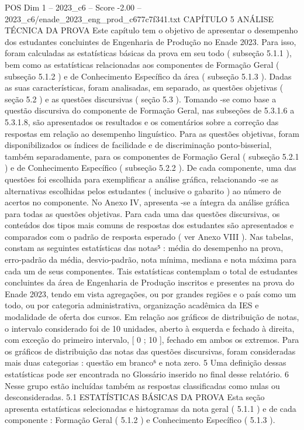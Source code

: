 \begin{textsample}{POS Dim 1 – 2023\_c6 – Score -2.00 – 2023\_c6/enade\_2023\_eng\_prod\_c677c7f341.txt}  \label{ex:f1_pos_237}
CAPÍTULO 5 ANÁLISE TÉCNICA DA PROVA Este capítulo tem o objetivo de apresentar o desempenho dos estudantes concluintes de Engenharia de Produção no Enade 2023.
Para isso, foram calculadas as estatísticas básicas da prova em seu todo ( subseção 5.1.1 ), bem como as estatísticas relacionadas aos componentes de Formação Geral ( subseção 5.1.2 ) e de Conhecimento Específico da área ( subseção 5.1.3 ).
Dadas as suas características, foram analisadas, em separado, as questões objetivas ( seção 5.2 ) e as questões discursivas ( seção 5.3 ).
Tomando -se como base a questão discursiva do componente de Formação Geral, nas subseções de 5.3.1.6 a 5.3.1.8, são apresentados os resultados e os comentários sobre a correção das respostas em relação ao desempenho linguístico.
Para as questões objetivas, foram disponibilizados os índices de facilidade e de discriminação ponto-bisserial, também separadamente, para os componentes de Formação Geral ( subseção 5.2.1 ) e de Conhecimento Específico ( subseção 5.2.2 ).
De cada componente, uma das questões foi escolhida para exemplificar a análise gráfica, relacionando -se as alternativas escolhidas pelos estudantes ( inclusive o gabarito ) ao número de acertos no componente.
No Anexo IV, apresenta -se a íntegra da análise gráfica para todas as questões objetivas.
Para cada uma das questões discursivas, os conteúdos dos tipos mais comuns de respostas dos estudantes são apresentados e comparados com o padrão de resposta esperado ( ver Anexo VIII ).
Nas tabelas, constam as seguintes estatísticas das notas⁵ : média do desempenho na prova, erro-padrão da média, desvio-padrão, nota mínima, mediana e nota máxima para cada um de seus componentes.
Tais estatísticas contemplam o total de estudantes concluintes da área de Engenharia de Produção inscritos e presentes na prova do Enade 2023, tendo em vista agregações, ou por grandes regiões e o país como um todo, ou por categoria administrativa, organização acadêmica da IES e modalidade de oferta dos cursos.
Em relação aos gráficos de distribuição de notas, o intervalo considerado foi de 10 unidades, aberto à esquerda e fechado à direita, com exceção do primeiro intervalo, [ 0 ; 10 ], fechado em ambos os extremos.
Para os gráficos de distribuição das notas das questões discursivas, foram consideradas mais duas categorias : questão em branco⁶ e nota zero. 5 Uma definição dessas estatísticas pode ser encontrada no Glossário inserido no final desse relatório. 6 Nesse grupo estão incluídas também as respostas classificadas como nulas ou desconsideradas. 5.1 ESTATÍSTICAS BÁSICAS DA PROVA Esta seção apresenta estatísticas selecionadas e histogramas da nota geral ( 5.1.1 ) e de cada componente : Formação Geral ( 5.1.2 ) e Conhecimento Específico ( 5.1.3 ).

\end{textsample}

